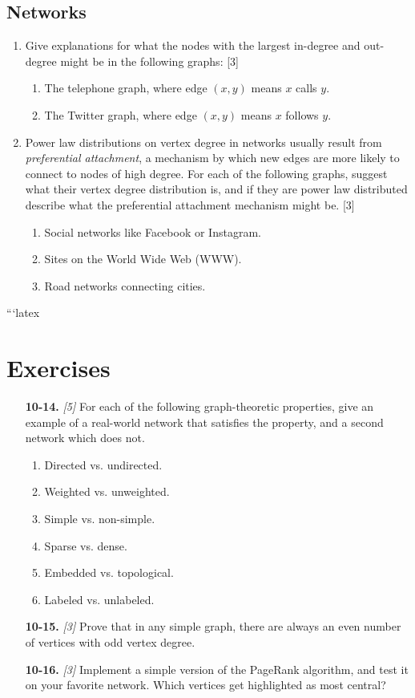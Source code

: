 \documentclass[10pt]{article}
\begin{document}
\subsection{Networks}

\begin{enumerate}
    \item Give explanations for what the nodes with the largest in-degree and out-degree might be in the following graphs: \hfill [3]
    \begin{enumerate}
        \item The telephone graph, where edge $(x, y)$ means $x$ calls $y$.
        \item The Twitter graph, where edge $(x, y)$ means $x$ follows $y$.
    \end{enumerate}
    \item Power law distributions on vertex degree in networks usually result from \emph{preferential attachment}, a mechanism by which new edges are more likely to connect to nodes of high degree. For each of the following graphs, suggest what their vertex degree distribution is, and if they are power law distributed describe what the preferential attachment mechanism might be. \hfill [3]
    \begin{enumerate}
        \item Social networks like Facebook or Instagram.
        \item Sites on the World Wide Web (WWW).
        \item Road networks connecting cities.
    \end{enumerate}
\end{enumerate}
```latex
\section*{Exercises}
\begin{enumerate}
  \setcounter{enumi}{13}
  \item[\textbf{10-14.}] \textit{[5]} For each of the following graph-theoretic properties, give an example of a real-world network that satisfies the property, and a second network which does not.
  \begin{enumerate}
    \item Directed vs. undirected.
    \item Weighted vs. unweighted.
    \item Simple vs. non-simple.
    \item Sparse vs. dense.
    \item Embedded vs. topological.
    \item Labeled vs. unlabeled.
  \end{enumerate}
  \item[\textbf{10-15.}] \textit{[3]} Prove that in any simple graph, there are always an even number of vertices with odd vertex degree.
  \item[\textbf{10-16.}] \textit{[3]} Implement a simple version of the PageRank algorithm, and test it on your favorite network. Which vertices get highlighted as most central?
\end{enumerate}
\end{document}
